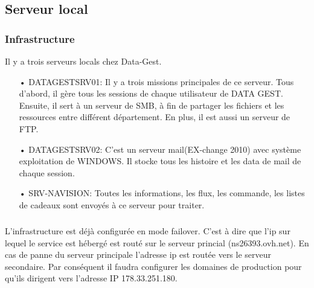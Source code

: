 \subsection{Serveur local}


\subsubsection{Infrastructure}
Il y a trois serveurs locals chez Data-Gest. 
\begin{itemize}
\item[•]DATAGESTSRV01: Il y a trois missions principales de ce serveur. Tous d'abord, il gère tous les sessions de chaque utilisateur de DATA GEST. Ensuite, il sert à un serveur de SMB, à fin de partager les fichiers et les ressources entre différent département. En plus, il est aussi un serveur de FTP.  
\item[•]DATAGESTSRV02: C'est un serveur mail(EX-change 2010) avec système exploitation de WINDOWS. Il stocke tous les histoire et les data de mail de chaque session. 
\item[•]SRV-NAVISION: Toutes les informations, les flux, les commande, les listes de cadeaux sont envoyés à ce serveur pour traiter.
\end{itemize}




\subparagraph{}
L'infrastructure est déjà configurée en mode failover. C'est à dire que l'ip sur lequel le service est hébergé est routé sur le
serveur princial (ns26393.ovh.net). En cas de panne du serveur principale l'adresse ip est routée vers le serveur
secondaire. Par conséquent il faudra configurer les domaines de production pour qu'ils dirigent vers l'adresse IP
178.33.251.180.




